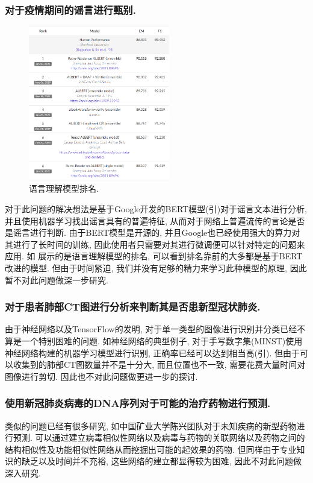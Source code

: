 \documentclass[lang=cn,11pt]{elegantpaper}
\begin{document}
\subsubsection*{对于疫情期间的谣言进行甄别.} 
\begin{figure}[htbp]
  \centering
  \includegraphics[width=0.55\textwidth]{rank}
  \caption{语言理解模型排名. \label{fig:rank}}
\end{figure}
对于此问题的解决想法是基于Google开发的BERT模型(引)对于谣言文本进行分析, 并且使用机器学习找出谣言具有的普遍特征, 从而对于网络上普遍流传的言论是否是谣言进行判断. 由于BERT模型是开源的, 并且Google也已经使用强大的算力对其进行了长时间的训练, 因此使用者只需要对其进行微调便可以针对特定的问题来应用. 如 展示的是语言理解模型的排名, 可以看到排名靠前的大多都是基于BERT改进的模型. 但由于时间紧迫, 我们并没有足够的精力来学习此种模型的原理, 因此暂不对此问题做深一步研究. 
\subsubsection*{对于患者肺部CT图进行分析来判断其是否患新型冠状肺炎.}
由于神经网络以及TensorFlow的发明, 对于单一类型的图像进行识别并分类已经不算是一个特别困难的问题. 如神经网络的典型例子, 对于手写数字集(MINST)使用神经网络构建的机器学习模型进行识别, 正确率已经可以达到相当高(引). 但由于可以收集到的肺部CT图数量并不是十分大, 而且位置也不一致, 需要花费大量时间对图像进行剪切. 因此也不对此问题做更进一步的探讨. 
\subsubsection*{使用新冠肺炎病毒的DNA序列对于可能的治疗药物进行预测. }
类似的问题已经有很多研究, 如中国矿业大学陈兴团队对于未知疾病的新型药物进行预测. 可以通过建立病毒相似性网络以及病毒与药物的关联网络以及药物之间的结构相似性及功能相似性网络从而挖掘出可能的起效果的药物. 但同样由于专业知识的缺乏以及时间并不充裕, 这些网络的建立都显得较为困难, 因此不对此问题做深入研究. 
\end{document}
